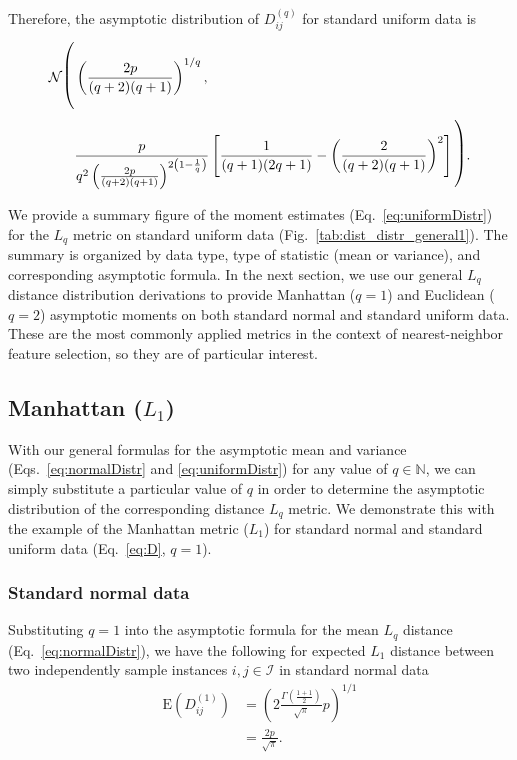 \documentclass[10pt,letterpaper]{article}
\begin{document}
Therefore, the asymptotic distribution of $D^{(q)}_{ij}$ for standard uniform data is
%
\begin{equation}\label{eq:uniformDistr}
\begin{split}
\mathcal{N}{\text{\LARGE $\Biggl($}}& \left(\frac{2p}{(q + 2)(q + 1)}\right)^{1/q}, \\
& \frac{p}{q^2\left(\frac{2p}{(q + 2)(q + 1)}\right)^{2\left(1 - \frac{1}{q}\right)}}\left[\frac{1}{(q + 1)(2q + 1)} - \left(\frac{2}{(q + 2)(q + 1)}\right)^2\right]{\text{\LARGE $\Biggr)$}}.
\end{split}
\end{equation}

We provide a summary figure of the moment estimates (Eq.~\ref{eq:uniformDistr}) for the $L_q$ metric on standard uniform data (Fig.~\ref{tab:dist_distr_general1}). The summary is organized by data type, type of statistic (mean or variance), and corresponding asymptotic formula. In the next section, we use our general $L_q$ distance distribution derivations to provide Manhattan ($q=1$) and Euclidean ($q=2$) asymptotic moments on both standard normal and standard uniform data. These are the most commonly applied metrics in the context of nearest-neighbor feature selection, so they are of particular interest.

\subsection{Manhattan \texorpdfstring{($L_1$)}{}}

With our general formulas for the asymptotic mean and variance (Eqs.~\ref{eq:normalDistr} and \ref{eq:uniformDistr}) for any value of $q \in \mathbb{N}$, we can simply substitute a particular value of $q$ in order to determine the asymptotic distribution of the corresponding distance $L_q$ metric. We demonstrate this with the example of the Manhattan metric ($L_1$) for standard normal and standard uniform data (Eq.~\ref{eq:D}, $q=1$).

\subsubsection{Standard normal data}

Substituting $q=1$ into the asymptotic formula for the mean $L_q$ distance (Eq.~\ref{eq:normalDistr}), we have the following for expected $L_1$ distance between two independently sample instances $i,j \in \mathcal{I}$ in standard normal data
%
\begin{equation}\label{eq:normalManMean}
\begin{aligned}
\text{E}\left(D^{(1)}_{ij}\right) &= \left(2\frac{\Gamma\left(\frac{1 + 1}{2}\right)}{\sqrt{\pi}}p\right)^{1/1} \\
&= \frac{2p}{\sqrt{\pi}}.
\end{aligned}
\end{equation}
\end{document}
